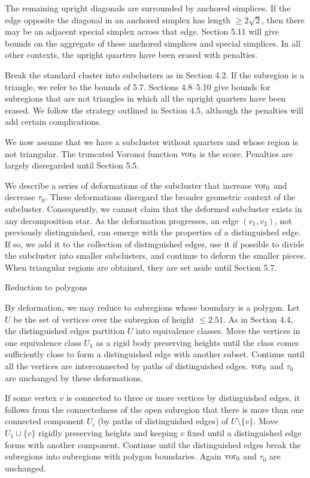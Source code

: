 The remaining upright diagonals are surrounded by anchored simplices.
If the edge opposite the diagonal in an anchored simplex has length
$\ge2\sqrt2$, then there may be an adjacent special simplex across
that edge.  Section 5.11 will give bounds on the aggregate of these
anchored simplices and special simplices.  In all other contexts,
the upright quarters have been erased with penalties.

Break the standard cluster into subclusters as in Section 4.2.
If the subregion is a triangle, we refer to the bounds of 5.7.
Sections 4.8--5.10 give bounds for subregions that are not
triangles in which all the upright quarters have been erased.
We follow the strategy outlined in Section 4.5, although the penalties
will add certain complications.

We now assume that we have a subcluster without quarters and whose
region is not triangular.  The truncated Voronoi function $\operatorname{vor}_0$
is the score.  Penalties are largely disregarded until Section 5.5.

We describe a series of deformations of the subcluster that increase
$\operatorname{vor}_0$ and decrease $\tau_0$.  These deformations disregard the
broader geometric context of the subcluster.  Consequently, we
cannot claim that the deformed subcluster exists in any decomposition
star.  As the deformation progresses, an edge $(v_1,v_2)$, not
previously distinguished, can emerge with the properties of
a distinguished edge.  If so, we add it to the collection of distinguished
edges, use it if possible to divide the subcluster into smaller
subclusters, and continue to deform the smaller pieces.  When
triangular regions are obtained, they are set aside until Section 5.7.

\subhead {} Reduction to polygons\endsubhead

By deformation, we may reduce to subregions whose boundary is
a polygon.  Let $U$ be the set of vertices over the subregion
of height $\le2.51$.  As in Section 4.4, the distinguished edges
partition $U$ into equivalence classes.  Move the vertices in
one equivalence class $U_1$ as a rigid body preserving heights until
the class comes sufficiently close to form a distinguished edge
with another subset.  Continue until all the vertices are
interconnected by paths of distinguished edges.  $\operatorname{vor}_0$ and
$\tau_0$ are unchanged by these deformations.

If some vertex $v$ is connected to three or more vertices by 
distinguished edges, it follows from the connectedness of the open
subregion that there is more than one connected component $U_i$
(by paths of distinguished edges) of $U\setminus\{v\}$.
Move $U_1\cup \{v\}$ rigidly preserving heights and keeping
$v$ fixed until a distinguished edge forms with another component.
Continue until the distinguished edges break the subregions into
subregions with polygon boundaries.  Again $\operatorname{vor}_0$ and
$\tau_0$ are unchanged.


